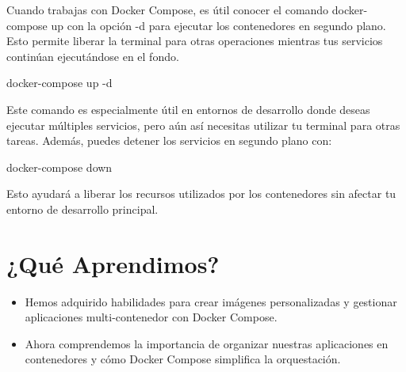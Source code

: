 \documentclass[
  a4paper,
  DIV=11,
  numbers=noendperiod,
  onepage,
  openany]{scrreprt}
\newenvironment{Shaded}{\begin{snugshade}}{\end{snugshade}}
\newcommand{\AttributeTok}[1]{\textcolor[rgb]{0.40,0.45,0.13}{#1}}
\newcommand{\ExtensionTok}[1]{\textcolor[rgb]{0.00,0.23,0.31}{#1}}
\newcommand{\NormalTok}[1]{\textcolor[rgb]{0.00,0.23,0.31}{#1}}
\providecommand{\tightlist}{%
  \setlength{\itemsep}{0pt}\setlength{\parskip}{0pt}}\usepackage{longtable,booktabs,array}
\begin{document}
\begin{tcolorbox}[enhanced jigsaw, opacityback=0, titlerule=0mm, bottomtitle=1mm, arc=.35mm, toptitle=1mm, breakable, colframe=quarto-callout-tip-color-frame, left=2mm, leftrule=.75mm, coltitle=black, rightrule=.15mm, toprule=.15mm, colbacktitle=quarto-callout-tip-color!10!white, colback=white, bottomrule=.15mm, title=\textcolor{quarto-callout-tip-color}{\faLightbulb}\hspace{0.5em}{Tip}, opacitybacktitle=0.6]

Cuando trabajas con Docker Compose, es útil conocer el comando
docker-compose up con la opción -d para ejecutar los contenedores en
segundo plano. Esto permite liberar la terminal para otras operaciones
mientras tus servicios continúan ejecutándose en el fondo.

\begin{Shaded}
\begin{Highlighting}[]
\ExtensionTok{docker{-}compose}\NormalTok{ up }\AttributeTok{{-}d}
\end{Highlighting}
\end{Shaded}

Este comando es especialmente útil en entornos de desarrollo donde
deseas ejecutar múltiples servicios, pero aún así necesitas utilizar tu
terminal para otras tareas. Además, puedes detener los servicios en
segundo plano con:

\begin{Shaded}
\begin{Highlighting}[]
\ExtensionTok{docker{-}compose}\NormalTok{ down}
\end{Highlighting}
\end{Shaded}

Esto ayudará a liberar los recursos utilizados por los contenedores sin
afectar tu entorno de desarrollo principal.

\end{tcolorbox}

\hypertarget{quuxe9-aprendimos-2}{%
\section{¿Qué Aprendimos?}\label{quuxe9-aprendimos-2}}

\begin{itemize}
\tightlist
\item
  Hemos adquirido habilidades para crear imágenes personalizadas y
  gestionar aplicaciones multi-contenedor con Docker Compose.
\item
  Ahora comprendemos la importancia de organizar nuestras aplicaciones
  en contenedores y cómo Docker Compose simplifica la orquestación.
\end{itemize}
\end{document}
